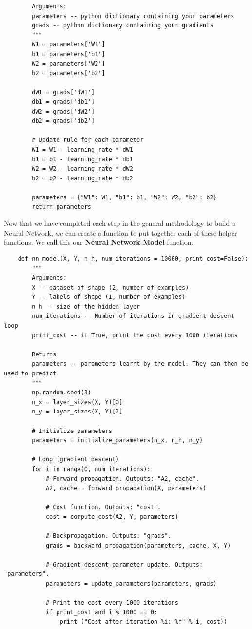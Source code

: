 \documentclass[11pt, a4paper]{article}
\begin{document}
\begin{spacing}{1.1}
\begin{lstlisting}
		Arguments:
		parameters -- python dictionary containing your parameters 
		grads -- python dictionary containing your gradients 
		"""
		W1 = parameters['W1']
		b1 = parameters['b1']
		W2 = parameters['W2']
		b2 = parameters['b2']

		dW1 = grads['dW1']
		db1 = grads['db1']
		dW2 = grads['dW2']
		db2 = grads['db2']

		# Update rule for each parameter
		W1 = W1 - learning_rate * dW1
		b1 = b1 - learning_rate * db1
		W2 = W2 - learning_rate * dW2
		b2 = b2 - learning_rate * db2
		
		parameters = {"W1": W1, "b1": b1, "W2": W2, "b2": b2}
		return parameters \end{lstlisting}
	Now that we have completed each step in the general methodology to build a Neural Network, we can create a function to put together each of these helper functions. We call this our \textbf{Neural Network Model} function. \newpage

	\begin{lstlisting}
	def nn_model(X, Y, n_h, num_iterations = 10000, print_cost=False):
		"""
		Arguments:
		X -- dataset of shape (2, number of examples)
		Y -- labels of shape (1, number of examples)
		n_h -- size of the hidden layer
		num_iterations -- Number of iterations in gradient descent loop
		print_cost -- if True, print the cost every 1000 iterations
		
		Returns:
		parameters -- parameters learnt by the model. They can then be used to predict.
		"""
		np.random.seed(3)
		n_x = layer_sizes(X, Y)[0]
		n_y = layer_sizes(X, Y)[2]
		
		# Initialize parameters
		parameters = initialize_parameters(n_x, n_h, n_y)
		
		# Loop (gradient descent)
		for i in range(0, num_iterations):
			# Forward propagation. Outputs: "A2, cache".
			A2, cache = forward_propagation(X, parameters)
			
			# Cost function. Outputs: "cost".
			cost = compute_cost(A2, Y, parameters)
			
			# Backpropagation. Outputs: "grads".
			grads = backward_propagation(parameters, cache, X, Y)
			
			# Gradient descent parameter update. Outputs: "parameters".
			parameters = update_parameters(parameters, grads)
			
			# Print the cost every 1000 iterations
			if print_cost and i % 1000 == 0:
				print ("Cost after iteration %i: %f" %(i, cost))
		

\end{lstlisting}
\end{spacing}
\end{document}
